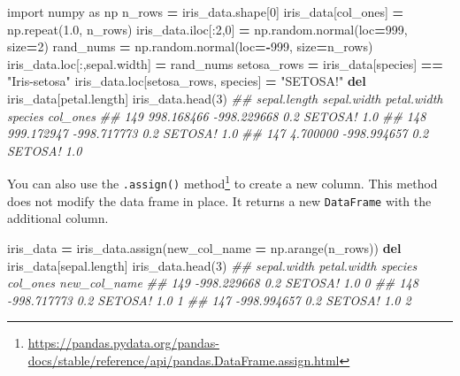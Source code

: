 \documentclass[
  12pt,
  krantz2]{krantz}
\makeatletter
\newenvironment{Shaded}{\begin{snugshade}}{\end{snugshade}}
\newcommand{\CommentTok}[1]{\textcolor[rgb]{0.37,0.37,0.37}{\textit{#1}}}
\newcommand{\DecValTok}[1]{\textcolor[rgb]{0.06,0.06,0.06}{#1}}
\newcommand{\FloatTok}[1]{\textcolor[rgb]{0.06,0.06,0.06}{#1}}
\newcommand{\ImportTok}[1]{#1}
\newcommand{\KeywordTok}[1]{\textcolor[rgb]{0.27,0.27,0.27}{\textbf{#1}}}
\newcommand{\NormalTok}[1]{#1}
\newcommand{\OperatorTok}[1]{\textcolor[rgb]{0.43,0.43,0.43}{\textbf{#1}}}
\newcommand{\StringTok}[1]{\textcolor[rgb]{0.5,0.5,0.5}{#1}}
\renewcommand{\href}[2]{#2\footnote{\url{#1}}}
\newenvironment{kframe}{%
\medskip{}
\setlength{\fboxsep}{.8em}
 \def\at@end@of@kframe{}%
 \ifinner\ifhmode%
  \def\at@end@of@kframe{\end{minipage}}%
  \begin{minipage}{\columnwidth}%
 \fi\fi%
 \def\FrameCommand##1{\hskip\@totalleftmargin \hskip-\fboxsep
 \colorbox{shadecolor}{##1}\hskip-\fboxsep
     \hskip-\linewidth \hskip-\@totalleftmargin \hskip\columnwidth}%
 \MakeFramed {\advance\hsize-\width
   \@totalleftmargin\z@ \linewidth\hsize
   \@setminipage}}%
 {\par\unskip\endMakeFramed%
 \at@end@of@kframe}
\renewenvironment{Shaded}{\begin{kframe}}{\end{kframe}}
\makeatother
\begin{document}
\begin{Shaded}
\begin{Highlighting}[]
\ImportTok{import}\NormalTok{ numpy }\ImportTok{as}\NormalTok{ np}
\NormalTok{n\_rows }\OperatorTok{=}\NormalTok{ iris\_data.shape[}\DecValTok{0}\NormalTok{]}
\NormalTok{iris\_data[}\StringTok{\textquotesingle{}col\_ones\textquotesingle{}}\NormalTok{] }\OperatorTok{=}\NormalTok{ np.repeat(}\FloatTok{1.0}\NormalTok{, n\_rows)}
\NormalTok{iris\_data.iloc[:}\DecValTok{2}\NormalTok{,}\DecValTok{0}\NormalTok{] }\OperatorTok{=}\NormalTok{  np.random.normal(loc}\OperatorTok{=}\DecValTok{999}\NormalTok{, size}\OperatorTok{=}\DecValTok{2}\NormalTok{)}
\NormalTok{rand\_nums }\OperatorTok{=}\NormalTok{ np.random.normal(loc}\OperatorTok{={-}}\DecValTok{999}\NormalTok{, size}\OperatorTok{=}\NormalTok{n\_rows)}
\NormalTok{iris\_data.loc[:,}\StringTok{\textquotesingle{}sepal.width\textquotesingle{}}\NormalTok{] }\OperatorTok{=}\NormalTok{ rand\_nums}
\NormalTok{setosa\_rows }\OperatorTok{=}\NormalTok{ iris\_data[}\StringTok{\textquotesingle{}species\textquotesingle{}}\NormalTok{] }\OperatorTok{==} \StringTok{"Iris{-}setosa"}
\NormalTok{iris\_data.loc[setosa\_rows, }\StringTok{\textquotesingle{}species\textquotesingle{}}\NormalTok{] }\OperatorTok{=} \StringTok{"SETOSA!"}
\KeywordTok{del}\NormalTok{ iris\_data[}\StringTok{\textquotesingle{}petal.length\textquotesingle{}}\NormalTok{]}
\NormalTok{iris\_data.head(}\DecValTok{3}\NormalTok{)}
\CommentTok{\#\#      sepal.length  sepal.width  petal.width  species  col\_ones}
\CommentTok{\#\# 149    998.168466  {-}998.229668          0.2  SETOSA!       1.0}
\CommentTok{\#\# 148    999.172947  {-}998.717773          0.2  SETOSA!       1.0}
\CommentTok{\#\# 147      4.700000  {-}998.994657          0.2  SETOSA!       1.0}
\end{Highlighting}
\end{Shaded}

You can also use the \href{https://pandas.pydata.org/pandas-docs/stable/reference/api/pandas.DataFrame.assign.html}{\texttt{.assign()} method} to create a new column. This method does not modify the data frame in place. It returns a new \texttt{DataFrame} with the additional column.

\begin{Shaded}
\begin{Highlighting}[]
\NormalTok{iris\_data }\OperatorTok{=}\NormalTok{ iris\_data.assign(new\_col\_name }\OperatorTok{=}\NormalTok{ np.arange(n\_rows))}
\KeywordTok{del}\NormalTok{ iris\_data[}\StringTok{\textquotesingle{}sepal.length\textquotesingle{}}\NormalTok{]}
\NormalTok{iris\_data.head(}\DecValTok{3}\NormalTok{)}
\CommentTok{\#\#      sepal.width  petal.width  species  col\_ones  new\_col\_name}
\CommentTok{\#\# 149  {-}998.229668          0.2  SETOSA!       1.0             0}
\CommentTok{\#\# 148  {-}998.717773          0.2  SETOSA!       1.0             1}
\CommentTok{\#\# 147  {-}998.994657          0.2  SETOSA!       1.0             2}
\end{Highlighting}
\end{Shaded}
\end{document}
